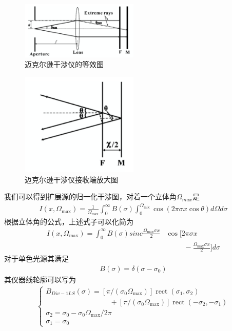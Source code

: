 \documentclass[conference]{IEEEtran}
\begin{document}
\begin{figure}[htbp]
    \centerline{\includegraphics[width=0.5\textwidth]{pic3.png}}
    \caption{迈克尔逊干涉仪的等效图}
    \label{pic3}
\end{figure}

\begin{figure}[htbp]
    \centerline{\includegraphics[width=0.5\textwidth]{pic4.png}}
    \caption{迈克尔逊干涉仪接收端放大图}
    \label{pic4}
\end{figure}
我们可以得到扩展源的归一化干涉图，对着一个立体角$\Omega_{max}$是
\begin{align*}
    I\left(x, \Omega_{\max }\right)=\frac{1}{\Omega_{\max }}\int_{0}^{\infty} B(\sigma) \int_{0}^{\Omega_{\operatorname{mix}}} \cos (2 \pi \sigma x \cos \theta) d \Omega d \sigma
\end{align*}
根据立体角的公式，上述式子可以化简为
\begin{align*}
    I\left(x, \Omega_{\max }\right)=\int_{0}^{\infty} B(\sigma) sinc \frac{\Omega_{\max } \sigma x }{2}  &\cos [2 \pi \sigma x\\
    & \;\;\;\;\;\;\;\;\;- \frac{\Omega_{\max } \sigma x }{2}] d \sigma
\end{align*}
对于单色光源其满足
\begin{align*}
    B(\sigma) = \delta(\sigma-\sigma_0)
\end{align*}
其仪器线轮廓可以写为
\begin{align*}
    \begin{cases}
        B_{D i v-1 L S}(\sigma)=[\pi /(\sigma_{0} \Omega_{\max })] \operatorname{rect}(\sigma_{1}, \sigma_{2})\\ \;\;\;\;\;\;\;\;\;\;\;\;\;\;\;\;\;\;\;\;\;\;\;\;\;\;\;\;\;\;\;\;+[\pi /(\sigma_{0} \Omega_{\max })] \operatorname{rect}(-\sigma_{2},-\sigma_{1}) \\
        \sigma_{2}=\sigma_{0}-\sigma_{0} \Omega_{\max } / 2 \pi \\
        \sigma_{1}=\sigma_{0}
    \end{cases}
\end{align*}
\end{document}
